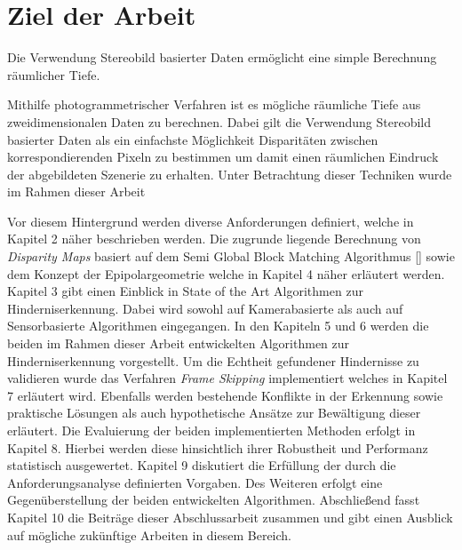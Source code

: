 \section{Ziel der Arbeit}
\label{sec:ziel_der_arbeit}
Die Verwendung Stereobild basierter Daten ermöglicht eine simple Berechnung räumlicher Tiefe.

Mithilfe photogrammetrischer Verfahren ist es mögliche räumliche Tiefe aus zweidimensionalen Daten zu berechnen. Dabei gilt die Verwendung Stereobild basierter Daten als ein einfachste Möglichkeit Disparitäten zwischen korrespondierenden Pixeln zu bestimmen um damit einen räumlichen Eindruck der abgebildeten Szenerie zu erhalten. Unter Betrachtung dieser Techniken wurde im Rahmen dieser Arbeit 

Vor diesem Hintergrund werden diverse Anforderungen definiert, welche in Kapitel 2 näher beschrieben werden. Die zugrunde liegende Berechnung von \emph{Disparity Maps} basiert auf dem Semi Global Block Matching Algorithmus [\cite{sgbm}] sowie dem Konzept der Epipolargeometrie welche in Kapitel 4 näher erläutert werden. Kapitel 3 gibt einen Einblick in State of the Art Algorithmen zur Hinderniserkennung. Dabei wird sowohl auf Kamerabasierte als auch auf Sensorbasierte Algorithmen eingegangen. In den Kapiteln 5 und 6 werden die beiden im Rahmen dieser Arbeit entwickelten Algorithmen zur Hinderniserkennung vorgestellt. Um die Echtheit gefundener Hindernisse zu validieren wurde das Verfahren \emph{Frame Skipping} implementiert welches in Kapitel 7 erläutert wird. Ebenfalls werden bestehende Konflikte in der Erkennung sowie praktische Lösungen als auch hypothetische Ansätze zur Bewältigung dieser erläutert. Die Evaluierung der beiden implementierten Methoden erfolgt in Kapitel 8. Hierbei werden diese hinsichtlich ihrer Robustheit und Performanz statistisch ausgewertet. Kapitel 9 diskutiert die Erfüllung der durch die Anforderungsanalyse definierten Vorgaben. Des Weiteren erfolgt eine Gegenüberstellung der beiden entwickelten Algorithmen. Abschließend fasst Kapitel 10 die Beiträge dieser Abschlussarbeit zusammen und gibt einen Ausblick auf mögliche zukünftige Arbeiten in diesem Bereich.